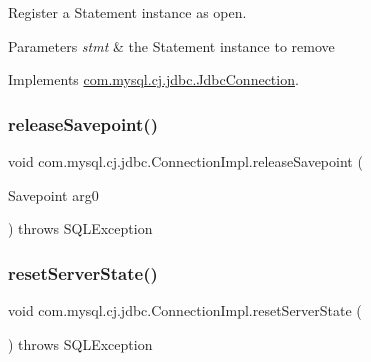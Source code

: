 Register a Statement instance as open.


\begin{DoxyParams}{Parameters}
{\em stmt} & the Statement instance to remove \\
\hline
\end{DoxyParams}


Implements \mbox{\hyperlink{interfacecom_1_1mysql_1_1cj_1_1jdbc_1_1_jdbc_connection_ae2bd1cf8c944f811560e419b9fcefc91}{com.\+mysql.\+cj.\+jdbc.\+Jdbc\+Connection}}.

\mbox{\label{classcom_1_1mysql_1_1cj_1_1jdbc_1_1_connection_impl_a8fb92c8ea1c85d236a54bb88bafb7349}} 
\subsubsection{\texorpdfstring{release\+Savepoint()}{releaseSavepoint()}}
{\footnotesize\ttfamily void com.\+mysql.\+cj.\+jdbc.\+Connection\+Impl.\+release\+Savepoint (\begin{DoxyParamCaption}\item[{Savepoint}]{arg0 }\end{DoxyParamCaption}) throws S\+Q\+L\+Exception}

\mbox{\label{classcom_1_1mysql_1_1cj_1_1jdbc_1_1_connection_impl_adccdf6ec2e52545cff1a649ccecbdd62}} 
\subsubsection{\texorpdfstring{reset\+Server\+State()}{resetServerState()}}
{\footnotesize\ttfamily void com.\+mysql.\+cj.\+jdbc.\+Connection\+Impl.\+reset\+Server\+State (\begin{DoxyParamCaption}{ }\end{DoxyParamCaption}) throws S\+Q\+L\+Exception}


